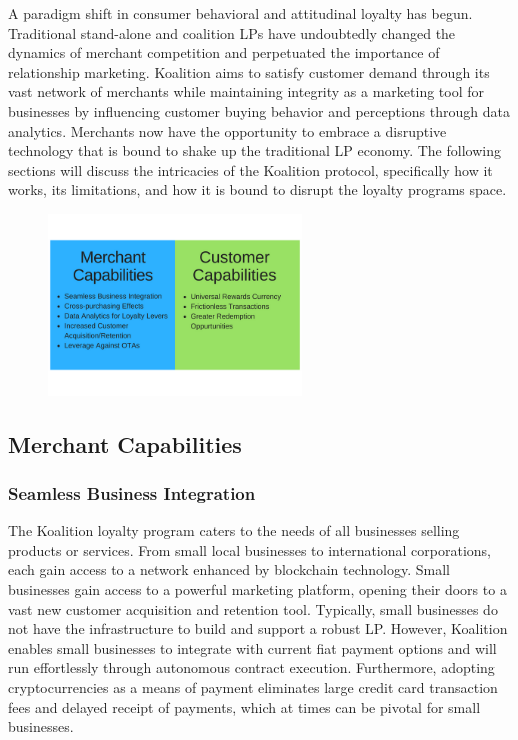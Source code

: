 A paradigm shift in consumer behavioral and attitudinal loyalty has begun. Traditional stand-alone and coalition LPs have undoubtedly changed the dynamics of merchant competition and perpetuated the importance of relationship marketing. Koalition aims to satisfy customer demand through its vast network of merchants while maintaining integrity as a marketing tool for businesses by influencing customer buying behavior and perceptions through data analytics. Merchants now have the opportunity to embrace a disruptive technology that is bound to shake up the traditional LP economy. The following sections will discuss the intricacies of the Koalition protocol, specifically how it works, its limitations, and how it is bound to disrupt the loyalty programs space.
%
\begin{figure}[h]%
	\centering
	\includegraphics[keepaspectratio, width=0.6\textwidth]{images/KoaCapes.png} \\
\end{figure}
%
\subsection{Merchant Capabilities}

\subsubsection{Seamless Business Integration}
The Koalition loyalty program caters to the needs of all businesses selling products or services. From small local businesses to international corporations, each gain access to a network enhanced by blockchain technology. Small businesses gain access to a powerful marketing platform, opening their doors to a vast new customer acquisition and retention tool. Typically, small businesses do not have the infrastructure to build and support a robust LP. However, Koalition enables small businesses to integrate with current fiat payment options and will run effortlessly through autonomous contract execution. Furthermore, adopting cryptocurrencies as a means of payment eliminates large credit card transaction fees and delayed receipt of payments, which at times can be pivotal for small businesses.

